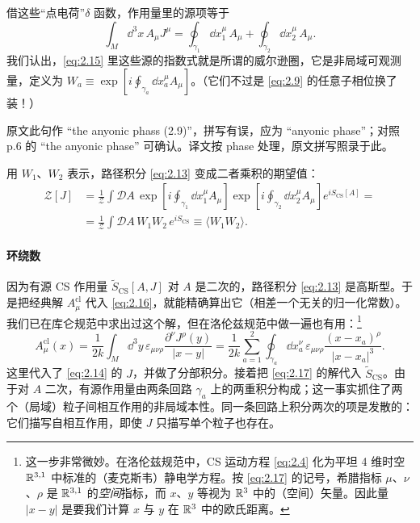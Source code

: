 借这些“点电荷”$\delta$ 函数，作用量里的源项等于
\begin{equation}\tag{2.15}\label{eq:2.15}
  \int_M \dd^3x\,A_\mu J^\mu = \oint_{\gamma_1}\dd x_1^\mu\,A_\mu + \oint_{\gamma_2}\dd x_2^\mu\,A_\mu .
\end{equation}
我们认出，\eqref{eq:2.15} 里这些源的指数式就是所谓的威尔逊圈，它是非局域可观测量，定义为 $W_a\equiv\exp\left[i\oint_{\gamma_a}\dd x_a^\mu A_\mu\right]$。（它们不过是 \eqref{eq:2.9} 的任意子相位换了装！）

\begin{yizhu}[原文疑误]
原文此句作 “the anyonic phass (2.9)”，拼写有误，应为 “anyonic phase”；对照 p.6 的 “the anyonic phase” 可确认。译文按 phase 处理，原文拼写照录于此。
\end{yizhu}

用 $W_1$、$W_2$ 表示，路径积分 \eqref{eq:2.13} 变成二者乘积的期望值：
\begin{equation}\tag{2.16}\label{eq:2.16}
  \begin{aligned}
  \mathcal{Z}[J] &= \frac{1}{\mathcal{Z}}\int\mathcal{D}A\,\exp\left[i\oint_{\gamma_1}\dd x_1^\mu A_\mu\right]\exp\left[i\oint_{\gamma_2}\dd x_2^\mu A_\mu\right]e^{iS_{\mathrm{CS}}[A]} = \\
  &= \frac{1}{\mathcal{Z}}\int\mathcal{D}A\,W_1W_2\,e^{iS_{\mathrm{CS}}} \equiv \langle W_1W_2\rangle .
  \end{aligned}
\end{equation}

\paragraph{环绕数} %
因为有源 CS 作用量 $\widetilde{S}_{\mathrm{CS}}[A,J]$ 对 $A$ 是二次的，路径积分 \eqref{eq:2.13} 是高斯型。于是把经典解 $A_\mu^{\mathrm{cl}}$ 代入 \eqref{eq:2.16}，就能精确算出它（相差一个无关的归一化常数）。我们已在库仑规范中求出过这个解，但在洛伦兹规范中做一遍也有用：\footnote{这一步非常微妙。在洛伦兹规范中，CS 运动方程 \eqref{eq:2.4} 化为平坦 4 维时空 $\mathbb{R}^{3,1}$ 中标准的（麦克斯韦）静电学方程。按 \eqref{eq:2.17} 的记号，希腊指标 $\mu$、$\nu$、$\rho$ 是 $\mathbb{R}^{3,1}$ 的\emph{空间}指标，而 $x$、$y$ 等视为 $\mathbb{R}^3$ 中的（空间）矢量。因此量 $|x-y|$ 是要我们计算 $x$ 与 $y$ 在 $\mathbb{R}^3$ 中的欧氏距离。}
\begin{equation}\tag{2.17}\label{eq:2.17}
  A_\mu^{\mathrm{cl}}(x) = \frac{1}{2k}\int_M \dd^3y\,\varepsilon_{\mu\nu\rho}\frac{\partial^\nu J^\rho(y)}{|x-y|}
  = \frac{1}{2k}\sum_{a=1}^{2}\oint_{\gamma_a}\dd x_a^\nu\,\varepsilon_{\mu\nu\rho}\frac{(x-x_a)^\rho}{|x-x_a|^3} .
\end{equation}
这里代入了 \eqref{eq:2.14} 的 $J$，并做了分部积分。接着把 \eqref{eq:2.17} 的解代入 $\widetilde{S}_{\mathrm{CS}}$。由于对 $A$ 二次，有源作用量由两条回路 $\gamma_a$ 上的两重积分构成；这一事实抓住了两个（局域）粒子间相互作用的非局域本性。同一条回路上积分两次的项是发散的：它们描写自相互作用，即使 $J$ 只描写单个粒子也存在。

